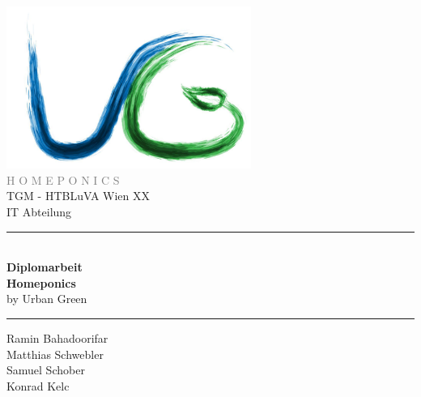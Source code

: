 \documentclass[12pt]{article}
\author{Homeponics}
\date{\today}
\newcommand\blankpage{%
    \null
    \thispagestyle{empty}%
    \addtocounter{page}{-1}%
    \newpage}
\begin{document}

\afterpage{\blankpage}

\begin{titlepage}
\begin{center}

\includegraphics[width=0.6\textwidth]{images/logo}\\
\LARGE \textcolor{gray}{\selectfont H O M E P O N I C S} \\[0.5cm]
\LARGE TGM - HTBLuVA Wien XX \\ IT Abteilung  \\[1.2cm]

\rule{1.0\textwidth}{1mm}
{ \huge \textbf{\\[0.4cm]  \huge Diplomarbeit \\ \LARGE Homeponics} \\ \large by Urban Green \\[0.1cm] }
\rule{1.0\textwidth}{1mm}

{ \LARGE Ramin Bahadoorifar \\ Matthias Schwebler \\ Samuel Schober \\ Konrad Kelc \\[0.4cm] }



\noindent 


\vfill

\end{center}

\end{titlepage}


\ohead{\headmark}
\ofoot{\pagemark}

\blankpage

\end{document}

